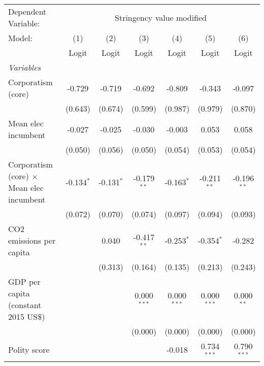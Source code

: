 
\begingroup
\centering
\begin{tabular}{lcccccc}
   \toprule
   Dependent Variable: & \multicolumn{6}{c}{Stringency value modified}\\
   Model:                                           & (1)          & (2)          & (3)           & (4)           & (5)           & (6)\\  
                                                    &  Logit       & Logit        & Logit         & Logit         & Logit         & Logit\\  
   \midrule
   \emph{Variables}\\
   Corporatism (core)                               & -0.729       & -0.719       & -0.692        & -0.809        & -0.343        & -0.097\\   
                                                    & (0.643)      & (0.674)      & (0.599)       & (0.987)       & (0.979)       & (0.870)\\   
   Mean elec incumbent                              & -0.027       & -0.025       & -0.030        & -0.003        & 0.053         & 0.058\\   
                                                    & (0.050)      & (0.056)      & (0.050)       & (0.054)       & (0.053)       & (0.054)\\   
   Corporatism (core) $\times$ Mean elec incumbent  & -0.134$^{*}$ & -0.131$^{*}$ & -0.179$^{**}$ & -0.163$^{*}$  & -0.211$^{**}$ & -0.196$^{**}$\\   
                                                    & (0.072)      & (0.070)      & (0.074)       & (0.097)       & (0.094)       & (0.093)\\   
   CO2 emissions per capita                         &              & 0.040        & -0.417$^{**}$ & -0.253$^{*}$  & -0.354$^{*}$  & -0.282\\   
                                                    &              & (0.313)      & (0.164)       & (0.135)       & (0.213)       & (0.243)\\   
   GDP per capita (constant 2015 US\$)              &              &              & 0.000$^{***}$ & 0.000$^{***}$ & 0.000$^{***}$ & 0.000$^{**}$\\   
                                                    &              &              & (0.000)       & (0.000)       & (0.000)       & (0.000)\\   
   Polity score                                     &              &              &               & -0.018        & 0.734$^{***}$ & 0.790$^{***}$\\   

\end{tabular}
